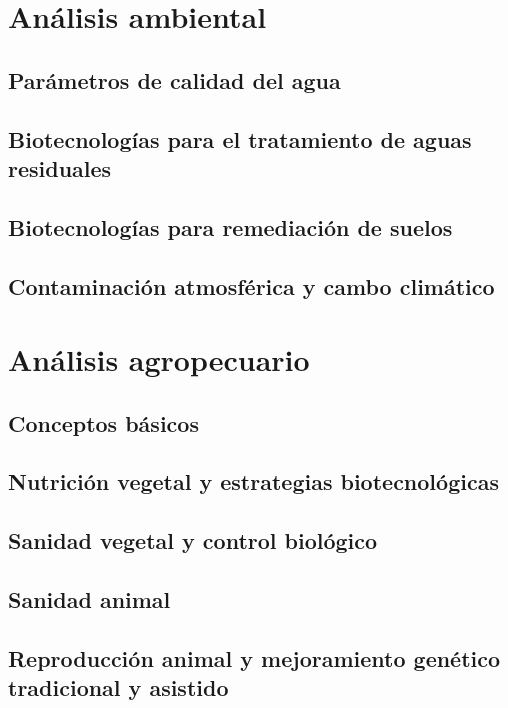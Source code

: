 \documentclass{../Resume}
\begin{document}
\part{Análisis ambiental}

    \chapter{Parámetros de calidad del agua}
    \chapter{Biotecnologías para el tratamiento de aguas residuales}
    \chapter{Biotecnologías para remediación de suelos}
    \chapter{Contaminación atmosférica y cambo climático}

\part{Análisis agropecuario}

    \chapter{Conceptos básicos}
    \chapter{Nutrición vegetal y estrategias biotecnológicas}
    \chapter{Sanidad vegetal y control biológico}
    \chapter{Sanidad animal}
    \chapter{Reproducción animal y mejoramiento genético tradicional y asistido}


\newpage


\end{document}
